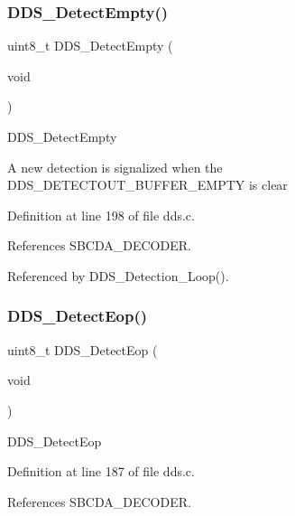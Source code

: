 \mbox{\label{group___d_d_s___a_p_i_ga8432fe55e46d995b5b36dc8c262c0d2d}} 
\subsubsection{\texorpdfstring{D\+D\+S\+\_\+\+Detect\+Empty()}{DDS\_DetectEmpty()}}
{\footnotesize\ttfamily uint8\+\_\+t D\+D\+S\+\_\+\+Detect\+Empty (\begin{DoxyParamCaption}\item[{void}]{ }\end{DoxyParamCaption})}

D\+D\+S\+\_\+\+Detect\+Empty

A new detection is signalized when the D\+D\+S\+\_\+\+D\+E\+T\+E\+C\+T\+O\+U\+T\+\_\+\+B\+U\+F\+F\+E\+R\+\_\+\+E\+M\+P\+TY is clear 

Definition at line 198 of file dds.\+c.



References S\+B\+C\+D\+A\+\_\+\+D\+E\+C\+O\+D\+ER.



Referenced by D\+D\+S\+\_\+\+Detection\+\_\+\+Loop().

\mbox{\label{group___d_d_s___a_p_i_gab9346847068834883c8aa90e94ccf847}} 
\subsubsection{\texorpdfstring{D\+D\+S\+\_\+\+Detect\+Eop()}{DDS\_DetectEop()}}
{\footnotesize\ttfamily uint8\+\_\+t D\+D\+S\+\_\+\+Detect\+Eop (\begin{DoxyParamCaption}\item[{void}]{ }\end{DoxyParamCaption})}

D\+D\+S\+\_\+\+Detect\+Eop 

Definition at line 187 of file dds.\+c.



References S\+B\+C\+D\+A\+\_\+\+D\+E\+C\+O\+D\+ER.



